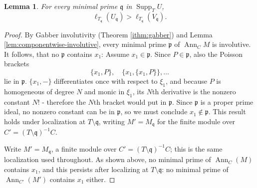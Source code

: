 \documentclass[11pt]{amsart}
\numberwithin{equation}{section}
\newtheorem{lemma}[theorem]{Lemma}
\theoremstyle{plain}
\theoremstyle{remark}
\begin{document}
\begin{lemma}\label{lem:strict-support-inequality}
For every minimal prime $\mathfrak q$ in $\operatorname{Supp}_T U$,
\[
 \ell_{T_{\mathfrak q}}(U_{\mathfrak q})
 > \ell_{T_{\mathfrak q}}(V_{\mathfrak q}).
\]
\end{lemma}
\begin{proof}
By Gabber involutivity (Theorem \ref{ithm:gabber}) and Lemma \ref{lem:componentwise-involutive},
every minimal prime $\mathfrak p$ of $\operatorname{Ann}_C M$ is involutive. It follows, that no $\mathfrak p$ contains ${x_1}$: Assume ${x_1}\in \mathfrak p$. Since $P \in \mathfrak p$,  also the Poisson brackets
\[ \{{x_1}, P\}, \quad \{{x_1}, \{x_1, P\}\}, \dots\]
lie in $\mathfrak p$. $\{{x_1},-\}$ differentiates once with respect to $\xi_1$, and because $P$ is homogeneous of degree $N$ and monic in $\xi_1$, its $N$th derivative is the nonzero constant $N!$ - therefore the $N$th bracket would put  in $\mathfrak p$. Since $\mathfrak p$ is a proper prime ideal, no nonzero constant can be in $\mathfrak p$, so we must conclude ${x_1} \notin \mathfrak p$.
This result holds under localization at $T\setminus\mathfrak q$, writing $M'=M_{\mathfrak q}$ for the finite module over $C'=(T\setminus\mathfrak q)^{-1}C$.

\AIadd{\newline}



Write $M'=M_{\mathfrak q}$, a finite module over $C'=(T\setminus\mathfrak q)^{-1}C$;
this is the same localization used throughout. As shown above, no minimal prime of
$\operatorname{Ann}_C(M)$ contains ${x_1}$, and this persists after localizing at
$T\setminus\mathfrak q$: no minimal prime of $\operatorname{Ann}_{C'}(M')$ contains ${x_1}$
either.


\end{proof}
\end{document}
